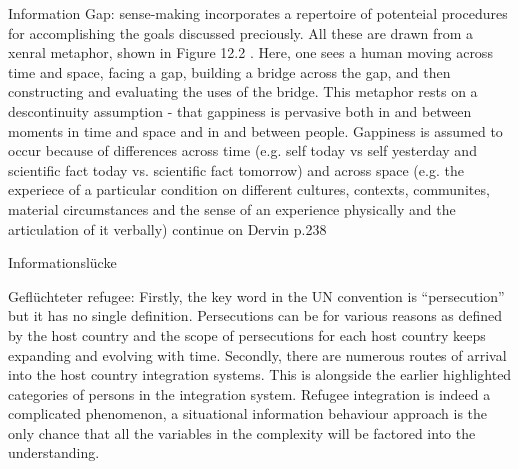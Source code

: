 \documentclass[12pt,oneside]{article}
\begin{document}
Information Gap:
\cite{dervin2003sense}
sense-making incorporates a repertoire of potenteial procedures for accomplishing the goals discussed preciously. All these are drawn from a xenral metaphor, shown in Figure 12.2 \includegraphics[width=00.5]{SMM_MEtaphor.jpg}. Here, one sees a human moving across time and space, facing a gap, building a bridge across the gap, and then constructing and evaluating the uses of the bridge. This metaphor rests on a descontinuity assumption - that gappiness is pervasive both in and between moments in time and space and in and between people. Gappiness is assumed to occur because of differences across time (e.g. self today vs self yesterday and scientific fact today vs. scientific fact tomorrow) and across space (e.g. the experiece of a particular condition on different cultures, contexts, communites, material circumstances and the sense of an experience physically and the articulation of it verbally)
continue on Dervin p.238

Informationslücke

Geflüchteter
refugee:
Firstly, the key word in the UN convention is “persecution”
but it has no single definition. Persecutions can be for
various reasons as defined by the host country and the
scope of persecutions for each host country keeps
expanding and evolving with time. Secondly, there are
numerous routes of arrival into the host country integration
systems. This is alongside the earlier highlighted categories
of persons in the integration system. Refugee integration is
indeed a complicated phenomenon, a situational
information behaviour approach is the only chance that all
the variables in the complexity will be factored into the
understanding.
\end{document}

